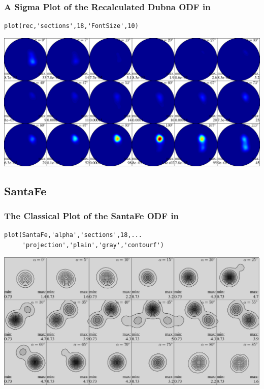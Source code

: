\begin{frame}[fragile]
  \frametitle{A Sigma Plot of the Recalculated Dubna ODF in \MTEX}

\begin{lstlisting}
plot(rec,'sections',18,'FontSize',10)
\end{lstlisting}

\medskip

\includegraphics[width=\textwidth]{pic/ODFso9}

\end{frame}

\subsection*{SantaFe}

\begin{frame}[fragile]
  \frametitle{The Classical Plot of the SantaFe ODF in \MTEX}

\begin{lstlisting}
plot(SantaFe,'alpha','sections',18,...
     'projection','plain','gray','contourf')
\end{lstlisting}

\includegraphics[width=\textwidth]{pic/santafee}

\end{frame}

